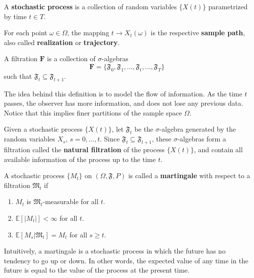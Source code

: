 \begin{definition}
	A \textbf{stochastic process} is a collection of random variables $\{ X(t) \}$ parametrized by time $t \in T$.  
	
	For each point $\omega \in \Omega$, the mapping $t \longrightarrow X_t(\omega)$ is the respective \textbf{sample path}, also called \textbf{realization} or \textbf{trajectory}.
\end{definition}

\begin{definition}[Filtration]
	A filtration $\textbf{F}$ is a collection of $\sigma$-algebras
	\[
		\textbf{F} = \{ \mathfrak{F}_0, \mathfrak{F}_1, \ldots, \mathfrak{F}_t, \ldots, \mathfrak{F}_T \}
	\]
	such that $\mathfrak{F}_t \subseteq \mathfrak{F}_{t+1}$.
\end{definition}

The idea behind this definition is to model the flow of information. As the time $t$ passes, the observer has more information, and does not lose any previous data. Notice that this implies finer partitions of the sample space $\Omega$.

Given a stochastic process $\{ X(t) \}$, let $\mathfrak{F}_t$ be the $\sigma$-algebra generated by the random variables $X_s$, $s = 0, \ldots, t$. Since $\mathfrak{F}_t \subseteq \mathfrak{F}_{t+1}$, these $\sigma$-algebras form a filtration called the \textbf{natural filtration} of the process $\{ X(t) \}$, and contain all available information of the process up to the time $t$.

\begin{definition}[Martingale]
	A stochastic process $\{M_t \}$ on $(\Omega, \mathfrak{F}, P)$ is called a \textbf{martingale} with respect to a filtration $\mathfrak{M}_t$ if 
	\begin{enumerate}
		\item $M_t$ is $\mathfrak{M}_t$-measurable for all $t$.
		\item $\mathbb{E}[|M_t|] < \infty$ for all $t$.
		\item $\mathbb{E}[M_s | \mathfrak{M}_t] = M_t$ for all $s \geq t$.
	\end{enumerate}
\end{definition}

Intuitively, a martingale is a stochastic process in which the future has no tendency to go up or down. In other words, the expected value of any time in the future is equal to the value of the process at the present time.

